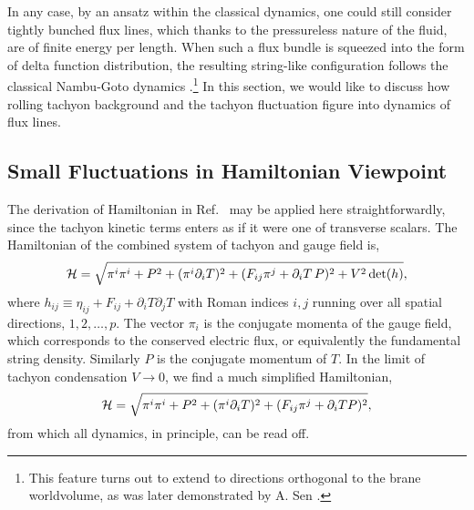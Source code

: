 \documentclass[a4paper,12pt]{article}
\newcommand{\p}{\partial}
\begin{document}
In any case, by an ansatz within the classical dynamics, 
one could still consider tightly bunched flux
lines, which thanks to the pressureless nature of the fluid, 
are of finite energy per length. When such a flux bundle is squeezed
into the form of delta function distribution, the resulting string-like
configuration follows the classical Nambu-Goto 
dynamics \cite{fluid,nielsen}.\footnote{This
feature turns out to extend to directions orthogonal to the
brane worldvolume, as was later demonstrated by A. Sen \cite{followup}.}  
In this
section, we would like to discuss how rolling tachyon background and 
the tachyon fluctuation figure into dynamics of flux lines.

\subsection{Small Fluctuations in Hamiltonian Viewpoint}

The derivation of Hamiltonian in Ref.~\cite{fluid} may be applied here
straightforwardly, since the tachyon kinetic terms enters as if it
were one of transverse scalars. The Hamiltonian of the combined
system of tachyon and gauge field is,
\begin{equation}
{\cal H}=\sqrt{ \pi^i\pi^i +P^2+(\pi^i\partial_i T)^2 + 
(F_{ij}\pi^j+\partial_i T\, P)^2 
+V^2\det(h)} ,
\end{equation}
where $h_{ij}\equiv \eta_{ij}+F_{ij} +\p_i T\p_j T $
with Roman indices $i,j$ running over all spatial directions,
$1,2,\dots,p$.
The vector $\pi_i$ is the conjugate momenta of the gauge field, which
corresponds to the conserved electric flux, or equivalently the
fundamental string density. Similarly $P$ is the conjugate momentum of
$T$. In the limit of tachyon condensation $V\rightarrow 0$, we find a
much simplified Hamiltonian,
\begin{equation}
{\cal H}=\sqrt{ \pi^i\pi^i +P^2+ (\pi^i\partial_i T)^2 +(F_{ij}\pi^j+
\partial_i T P)^2 } ,
\end{equation}
from which all dynamics, in principle,  can be read off.
\end{document}
